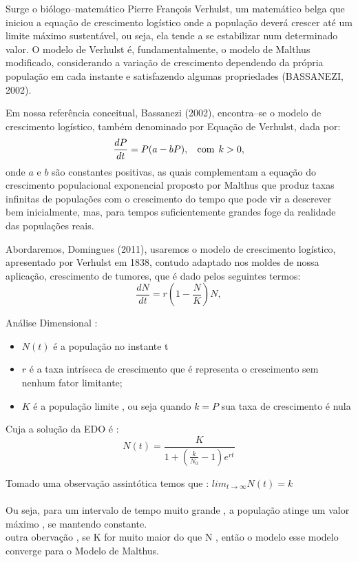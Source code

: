 Surge o biólogo--matemático Pierre François Verhulst, um matemático belga que iniciou a equação de crescimento logístico onde a população deverá crescer até um limite máximo sustentável, ou seja, ela tende a se estabilizar num determinado valor. O modelo de Verhulst é, fundamentalmente, o modelo de Malthus modificado, considerando a variação de crescimento dependendo da própria população em cada instante e satisfazendo algumas propriedades (BASSANEZI, 2002).

Em nossa referência conceitual, Bassanezi (2002), encontra--se o modelo de crescimento logístico, também denominado por Equação de Verhulst, dada por:
\begin{equation*}
\dfrac{dP}{dt} = P(a - bP),\hspace{2ex} \mbox{com}\hspace{1ex} k > 0,
\end{equation*}
onde $a$ e $b$ são constantes positivas, as quais complementam a equação do crescimento populacional exponencial proposto por Malthus que produz taxas infinitas de populações com o crescimento do tempo que pode vir a descrever bem inicialmente, mas, para tempos suficientemente grandes foge da realidade das populações reais.

Abordaremos, Domingues (2011), usaremos o modelo de crescimento logístico, apresentado por Verhulst em 1838, contudo adaptado nos moldes de nossa aplicação, crescimento de tumores, que é dado pelos seguintes termos:
\begin{equation*}
\dfrac{dN}{dt} = r \left(1 - \dfrac{N}{K}\right) N,
\end{equation*}

Análise Dimensional :
\begin{itemize}
    \item $N(t)$ é a população no instante t
    \item $r$ é a taxa intríseca de crescimento que é representa o crescimento sem nenhum fator limitante;
    \item $K$ é a população limite , ou seja quando $k=P$ sua taxa de crescimento é nula
\end{itemize}
Cuja a solução da EDO  é :
\begin{equation*}
    N(t)=\frac{K}{1+(\frac{k}{N_0}-1)e^{rt}}
\end{equation*}
    
Tomado uma observação assintótica temos que :
$lim_{t\to \infty} N(t)=k$\\
\\
Ou seja, para um intervalo de tempo muito grande , a população atinge um valor máximo , se mantendo constante.\\
outra obervação , se K for muito maior do que N , então o modelo esse modelo converge para o Modelo de Malthus.\\

